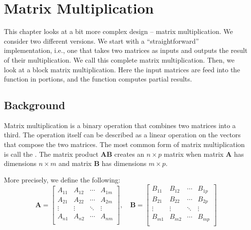 
\chapter{Matrix Multiplication}
\glsresetall
\label{chapter:matrix_multiplication}

This chapter looks at a bit more complex design -- matrix multiplication. We consider two different versions. We start with a ``straightforward'' implementation, i.e., one that takes two matrices as inputs and outputs the result of their multiplication. We call this complete matrix multiplication. Then, we look at a block matrix multiplication. Here the input matrices are feed into the function in portions, and the function computes partial results.

\section{Background}

Matrix multiplication is a binary operation that combines two matrices into a third. The operation itself can be described as a linear operation on the vectors that compose the two matrices. The most common form of matrix multiplication is call the . The matrix product $\mathbf{AB}$ creates an $n \times p$ matrix when matrix $\mathbf{A}$ has dimensions $n \times m$ and matrix $\mathbf{B}$ has dimensions $m \times p$. 

More precisely, we define the following: \begin{equation}
\mathbf{A} =
 \begin{bmatrix}
  A_{11} & A_{12}  & \cdots & A_{1m} \\
  A_{21} & A_{22}  & \cdots & A_{2m} \\
  \vdots  & \vdots  &\ddots & \vdots  \\
    A_{n1} & A_{n2}  & \cdots & A_{nm} \\
 \end{bmatrix},  \quad
\mathbf{B} =
 \begin{bmatrix}
  B_{11} & B_{12}  & \cdots & B_{1p} \\
  B_{21} & B_{22}  & \cdots & B_{2p} \\
  \vdots  & \vdots   &\ddots & \vdots  \\
  B_{m1} & B_{m2}  & \cdots & B_{mp} \\
 \end{bmatrix}
\end{equation} 

